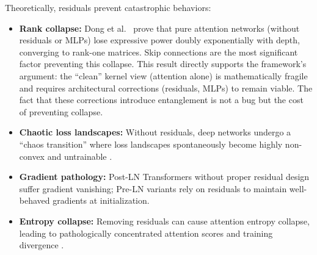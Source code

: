 \documentclass[11pt]{article}
\theoremstyle{definition}
\begin{document}
Theoretically, residuals prevent catastrophic behaviors:
\begin{itemize}
    \item \textbf{Rank collapse:} Dong et al.\ \cite{dong2021attention} prove that pure attention networks (without residuals or MLPs) lose expressive power doubly exponentially with depth, converging to rank-one matrices. Skip connections are the most significant factor preventing this collapse. This result directly supports the framework's argument: the ``clean'' kernel view (attention alone) is mathematically fragile and requires architectural corrections (residuals, MLPs) to remain viable. The fact that these corrections introduce entanglement is not a bug but the cost of preventing collapse.
    \item \textbf{Chaotic loss landscapes:} Without residuals, deep networks undergo a ``chaos transition'' where loss landscapes spontaneously become highly non-convex and untrainable \cite{li2018visualizing}.
    \item \textbf{Gradient pathology:} Post-LN Transformers without proper residual design suffer gradient vanishing; Pre-LN variants \cite{xiong2020layernorm} rely on residuals to maintain well-behaved gradients at initialization.
    \item \textbf{Entropy collapse:} Removing residuals can cause attention entropy collapse, leading to pathologically concentrated attention scores and training divergence \cite{zhai2023stabilizing}.
\end{itemize}
\end{document}
